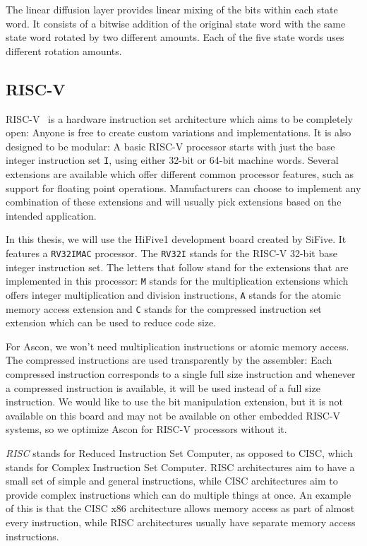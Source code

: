 The linear diffusion layer provides linear mixing of the bits within each state
word. It consists of a bitwise addition of the original state word with the same
state word rotated by two different amounts. Each of the five state words uses
different rotation amounts.

\subsection{RISC-V}
RISC-V~\cite{riscv} is a hardware instruction set architecture which aims to be
completely open: Anyone is free to create custom variations and implementations.
It is also designed to be modular: A basic RISC-V processor starts with just the
base integer instruction set \texttt{I}, using either 32-bit or 64-bit machine
words. Several extensions are available which offer different common processor
features, such as support for floating point operations. Manufacturers can
choose to implement any combination of these extensions and will usually pick
extensions based on the intended application.

In this thesis, we will use the HiFive1 development board created by SiFive. It
features a \texttt{RV32IMAC} processor. The \texttt{RV32I} stands for the RISC-V
32-bit base integer instruction set. The letters that follow stand for the
extensions that are implemented in this processor: \texttt{M} stands for the
multiplication extensions which offers integer multiplication and division
instructions, \texttt{A} stands for the atomic memory access extension and
\texttt{C} stands for the compressed instruction set extension which can be used
to reduce code size.

For Ascon, we won't need multiplication instructions or atomic memory access.
The compressed instructions are used transparently by the assembler: Each
compressed instruction corresponds to a single full size instruction and
whenever a compressed instruction is available, it will be used instead of a
full size instruction. We would like to use the bit manipulation extension, but
it is not available on this board and may not be available on other embedded
RISC-V systems, so we optimize Ascon for RISC-V processors without it.

\emph{RISC} stands for Reduced Instruction Set Computer, as opposed to CISC,
which stands for Complex Instruction Set Computer. RISC architectures aim to
have a small set of simple and general instructions, while CISC architectures
aim to provide complex instructions which can do multiple things at once. An
example of this is that the CISC x86 architecture allows memory access as part
of almost every instruction, while RISC architectures usually have separate
memory access instructions.

